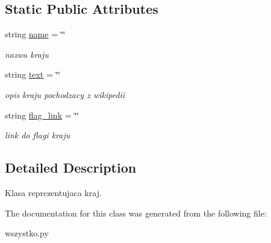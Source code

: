 \subsection*{Static Public Attributes}
\begin{DoxyCompactItemize}
\item 
\hypertarget{classwszystko_1_1_country_a8ccf841cb59e451791bcb2e1ac4f1edc}{string \hyperlink{classwszystko_1_1_country_a8ccf841cb59e451791bcb2e1ac4f1edc}{name} = \char`\"{}\char`\"{}}\label{classwszystko_1_1_country_a8ccf841cb59e451791bcb2e1ac4f1edc}

\begin{DoxyCompactList}\small\item\em nazwa kraju \end{DoxyCompactList}\item 
\hypertarget{classwszystko_1_1_country_a739bd7e413e61c963681e085a990979a}{string \hyperlink{classwszystko_1_1_country_a739bd7e413e61c963681e085a990979a}{text} = \char`\"{}\char`\"{}}\label{classwszystko_1_1_country_a739bd7e413e61c963681e085a990979a}

\begin{DoxyCompactList}\small\item\em opis kraju pochodzacy z wikipedii \end{DoxyCompactList}\item 
\hypertarget{classwszystko_1_1_country_a0a84a23b5d7e166646075f1b633845a1}{string \hyperlink{classwszystko_1_1_country_a0a84a23b5d7e166646075f1b633845a1}{flag\-\_\-link} = \char`\"{}\char`\"{}}\label{classwszystko_1_1_country_a0a84a23b5d7e166646075f1b633845a1}

\begin{DoxyCompactList}\small\item\em link do flagi kraju \end{DoxyCompactList}\end{DoxyCompactItemize}


\subsection{Detailed Description}
Klasa reprezentujaca kraj. 

The documentation for this class was generated from the following file\-:\begin{DoxyCompactItemize}
\item 
wszystko.\-py\end{DoxyCompactItemize}
